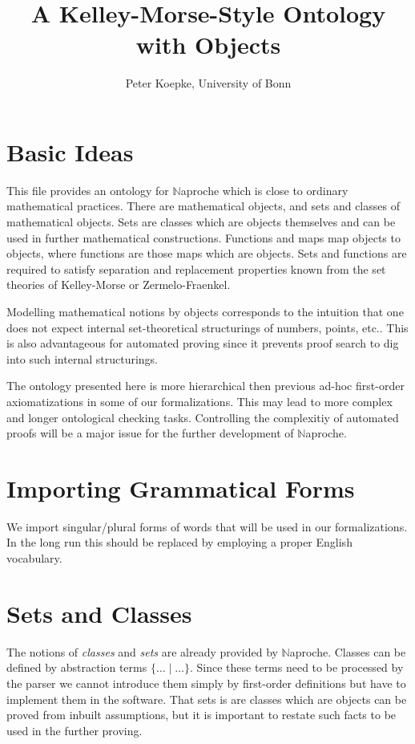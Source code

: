 \documentclass[11pt]{article}
\author{Peter Koepke, University of Bonn}
\title{A Kelley-Morse-Style Ontology with Objects}
\begin{document}
\newcommand{\val}[2]{#1_{#2}}
\newcommand{\Prod}[3]{#1_{#2} \cdots #1_{#3}}
\newcommand{\Seq}[2]{\{#1,\dots,#2\}}
\newcommand{\FinSet}[3]{\{#1_{#2},\dots,#1_{#3}\}}
\newcommand{\Primes}{\mathbb{P}}
\newcommand{\Naproche}{$\mathbb{N}$aproche}

\maketitle

\section{Basic Ideas}

This file provides an ontology for $\mathbb{N}$aproche which
is close to ordinary mathematical practices. There are
mathematical objects, and sets and classes of mathematical
objects. Sets are classes which are objects themselves and
can be used in further mathematical constructions. Functions
and maps map objects to objects, where functions are those
maps which are objects. Sets and functions are required to
satisfy separation and replacement properties known from the 
set theories of Kelley-Morse or Zermelo-Fraenkel.

Modelling mathematical notions by objects corresponds
to the intuition that one does not expect internal set-theoretical
structurings of numbers, points, etc.. This is also advantageous
for automated proving since it prevents proof search to
dig into such internal structurings.

The ontology presented here is more hierarchical then previous
ad-hoc first-order axiomatizations in some of our formalizations. This
may lead to more complex and longer ontological checking tasks.
Controlling the complexitiy of automated proofs will be a major
issue for the further development of $\mathbb{N}$aproche.

\section{Importing Grammatical Forms}
We import singular/plural forms of words that will be used in
our formalizations. In the long run this should be replaced by
employing a proper English vocabulary.

\begin{forthel}
\end{forthel}

\section{Sets and Classes}
The notions of \textit{classes} and \textit{sets} are already
provided by $\mathbb{N}$aproche. Classes can be defined by
abstraction terms $\{\dots\mid\dots\}$. Since these terms need to be 
processed by the parser we cannot introduce them simply by first-order
definitions but have to implement them in the software.
That sets is are classes which are objects can be proved
from inbuilt assumptions, but it is important to restate such
facts to be used in the further proving. 
\end{document}

